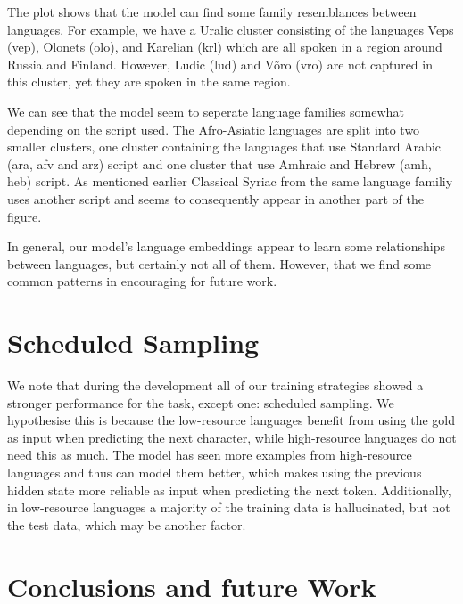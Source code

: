 \documentclass[11pt,a4paper]{article}
\begin{document}
The plot shows that the model can find some family resemblances
between languages. For example, we have a Uralic cluster consisting of
the languages Veps (vep), Olonets (olo), and Karelian (krl) which are
all spoken in a region around Russia and Finland. However, Ludic (lud)
and V\~{o}ro (vro) are not captured in this cluster, yet they are
spoken in the same region.


We can see that the model seem to seperate language families somewhat
depending on the script used. The Afro-Asiatic languages are split
into two smaller clusters, one cluster containing the languages that
use Standard Arabic (ara, afv and arz) script and one cluster that use
Amhraic and Hebrew (amh, heb) script. As mentioned earlier Classical
Syriac from the same language familiy uses another script and
seems to consequently appear in another part of the figure.

In general, our model's language embeddings appear to learn some
relationships between languages, but certainly not all of
them. However, that we find some common patterns in encouraging for
future work.

\section{Scheduled Sampling}

We note that during the development all of our training strategies
showed a stronger performance for the task, except one: scheduled
sampling. 
We hypothesise this is because the low-resource languages
benefit from using the gold as input when predicting the next
character, while high-resource languages do not need this as
much. The model has seen more examples from high-resource languages
and thus can model them better, which makes using the previous
hidden state more reliable as input when predicting the next token.
Additionally, in low-resource languages a majority of the training
data is hallucinated, but not the test data, which may be another
factor.

\section{Conclusions and future Work}
\end{document}

